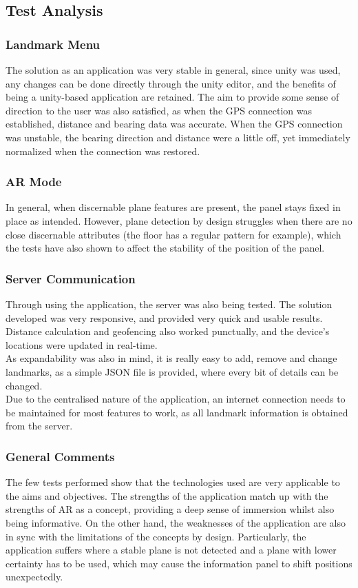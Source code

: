 
\subsection{Test Analysis}

\subsubsection{Landmark Menu}
The solution as an application was very stable in general, since unity was used, any changes can be done directly through the unity editor, and the benefits of being a 
unity-based application are retained. The aim to provide some sense of direction to the user was also satisfied, as when the GPS connection was established, distance 
and bearing data was accurate. When the GPS connection was unstable, the bearing direction and distance were a little off, yet immediately normalized when the connection was restored. 
\subsubsection{AR Mode}
In general, when discernable plane features are present, the panel stays fixed in place as intended.
However, plane detection by design struggles when there are no close discernable attributes (the floor has a regular pattern for example), which the tests 
have also shown to affect the stability of the position of the panel.
\subsubsection{Server Communication}
Through using the application, the server was also being tested. The solution developed was very responsive, and provided very quick and usable results. 
Distance calculation and geofencing also worked punctually, and the device's locations were updated in real-time.\\
As expandability was also in mind, it is really easy to add, remove and change landmarks, as a simple JSON file is provided, where every bit of details can be changed.\\
Due to the centralised nature of the application, an internet connection needs to be maintained for most features to work, 
as all landmark information is obtained from the server.
\subsubsection{General Comments}
The few tests performed show that the technologies used are very applicable to the aims and objectives. The strengths of the application match up with the strengths of AR as a concept, 
providing a deep sense of immersion whilst also being informative. On the other hand, the weaknesses of the application are also in sync with the limitations of the concepts by design. Particularly, the application suffers where a stable 
plane is not detected and a plane with lower certainty has to be used, which may cause the information panel to shift positions unexpectedly. 

